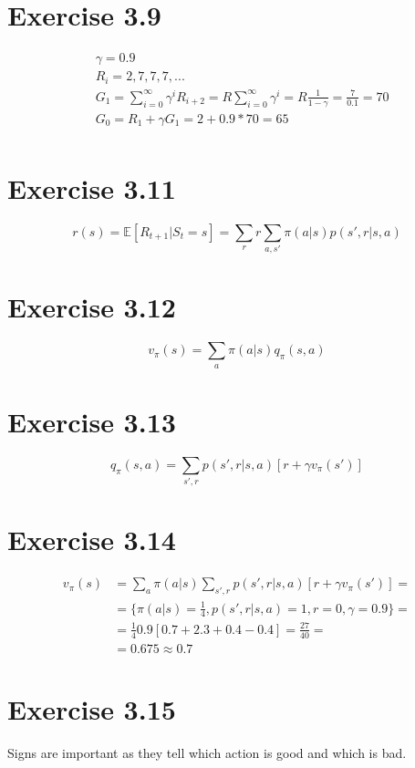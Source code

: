 \documentclass[12pt, a4paper]{article}
\begin{document}
    \section{Exercise 3.9}
        \begin{align*}
            &\gamma = 0.9\\
            &R_i = {2, 7, 7, 7, ...}\\
            &G_1 = \sum\limits_{i=0}^{\infty} \gamma^i R_{i + 2} = R \sum\limits_{i=0}^{\infty} \gamma^i = R \frac{1}{1 - \gamma} = \frac{7}{0.1} = 70\\
            &G_0 = R_1 + \gamma G_1 = 2 + 0.9 * 70 = 65\\
        \end{align*}

    \section{Exercise 3.11}
        $$r(s) = \mathbb{E}[R_{t+1}|S_t = s] = \sum\limits_r r
        \sum\limits_{a, s'} \pi(a|s) p(s',r|s,a)$$

    \section{Exercise 3.12}
        $$v_{\pi}(s) = \sum\limits_a \pi(a|s) q_\pi(s, a)$$

    \section{Exercise 3.13}
        $$q_\pi(s,a) = \sum\limits_{s',r} p(s',r|s,a)[r + \gamma v_\pi(s')]$$

    \section{Exercise 3.14}
        \begin{align*}
            v_\pi(s) &= \sum\limits_a \pi(a|s) \sum\limits_{s',r} p(s',r|s,a)
            [r + \gamma v_\pi(s')] =\\
            & = \{\pi(a|s) = \frac{1}{4}, p(s',r|s,a) = 1, r = 0, \gamma = 0.9\} =\\
            & = \frac{1}{4} 0.9 [0.7 + 2.3 + 0.4 - 0.4] = \frac{27}{40} =\\
            & = 0.675 \approx 0.7
        \end{align*}

    \section{Exercise 3.15}
        Signs are important as they tell which action is good and which is bad.
\end{document}
